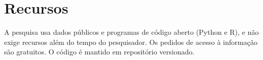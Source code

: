 \section{Recursos}

A pesquisa usa dados públicos e programas de código aberto (Python e R), e não
exige recursos além do tempo do pesquisador. Os pedidos de acesso à informação
são gratuitos. O código é mantido em repositório versionado.
